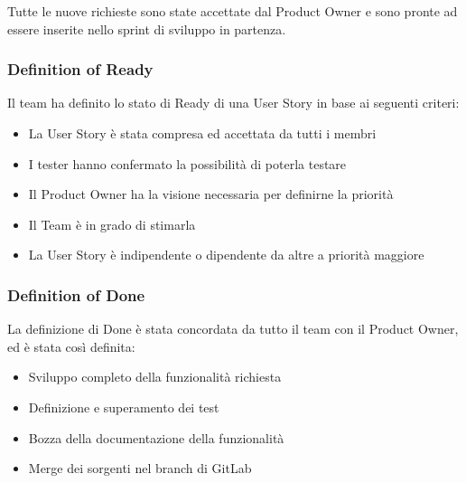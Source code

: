 \documentclass[letterpaper,10pt,italian]{sphinxmanual}
\begin{document}
\sphinxAtStartPar
Tutte le nuove richieste sono state accettate dal Product Owner e sono pronte ad essere inserite nello sprint di
sviluppo in partenza.


\subsubsection{Definition of Ready}
\label{\detokenize{development/sprint3/index:definition-of-ready}}
\sphinxAtStartPar
Il team ha definito lo stato di Ready di una User Story in base ai seguenti criteri:
\begin{itemize}
\item {} 
\sphinxAtStartPar
La User Story è stata compresa ed accettata da tutti i membri

\item {} 
\sphinxAtStartPar
I tester hanno confermato la possibilità di poterla testare

\item {} 
\sphinxAtStartPar
Il Product Owner ha la visione necessaria per definirne la priorità

\item {} 
\sphinxAtStartPar
Il Team è in grado di stimarla

\item {} 
\sphinxAtStartPar
La User Story è indipendente o dipendente da altre a priorità maggiore

\end{itemize}


\subsubsection{Definition of Done}
\label{\detokenize{development/sprint3/index:definition-of-done}}
\sphinxAtStartPar
La definizione di Done è stata concordata da tutto il team con il Product Owner, ed è stata così definita:
\begin{itemize}
\item {} 
\sphinxAtStartPar
Sviluppo completo della funzionalità richiesta

\item {} 
\sphinxAtStartPar
Definizione e superamento dei test

\item {} 
\sphinxAtStartPar
Bozza della documentazione della funzionalità

\item {} 
\sphinxAtStartPar
Merge dei sorgenti nel branch  di GitLab

\end{itemize}
\end{document}
